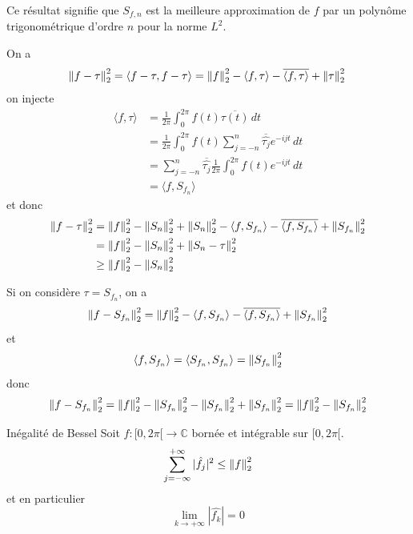 \documentclass[a4paper, 12pt]{article}
\begin{document}
\begin{remarque}
    Ce résultat signifie que $S_{f,n}$ est la meilleure approximation de $f$ par un polynôme trigonométrique d'ordre $n$ pour la norme $L^2$.
\end{remarque}

\begin{demonstration}
    On a 
    $$
    \left\lVert f - \tau\right\rVert_2^2 = \langle f - \tau, f - \tau \rangle = \left\lVert f\right\rVert_2^2 - \langle f, \tau \rangle - \overline{\langle f, \tau \rangle} + \left\lVert\tau\right\rVert_2^2 \\
    $$
    on injecte
    \begin{align*}
        \langle f, \tau \rangle &= \frac{1}{2\pi} \int_0^{2\pi} f(t) \overline{\tau(t)} \, dt \\
        &= \frac{1}{2\pi} \int_0^{2\pi} f(t) \sum_{j=-n}^n \overline{\hat{\tau_j}} e^{-ijt} \, dt \\
        &= \sum_{j=-n}^n \overline{\hat{\tau_j}} \frac{1}{2\pi} \int_0^{2\pi} f(t) e^{-ijt} \, dt \\
        &= \langle f, S_{f_n} \rangle
    \end{align*}
    et donc
    \begin{align*}  
        \left\lVert f - \tau\right\rVert_2^2 &= \left\lVert f\right\rVert_2^2 - \left\lVert S_n\right\rVert_2^2 + \left\lVert S_n\right\rVert_2^2 - \langle f, S_{f_n} \rangle - \overline{\langle f, S_{f_n} \rangle} + \left\lVert S_{f_n}\right\rVert_2^2 \\
        &= \left\lVert f\right\rVert_2^2 - \left\lVert S_n\right\rVert_2^2 + \left\lVert S_n - \tau\right\rVert_2^2 \\
        &\geq \left\lVert f\right\rVert_2^2 - \left\lVert S_n\right\rVert_2^2
    \end{align*}

    Si on considère $\tau = S_{f_n}$, on a
    $$
    \left\lVert f - S_{f_n}\right\rVert_2^2 = \left\lVert f\right\rVert_2^2 - \langle f, S_{f_n} \rangle - \overline{\langle f, S_{f_n} \rangle} + \left\lVert S_{f_n}\right\rVert_2^2
    $$
    et
    $$
    \langle f, S_{f_n} \rangle = \langle S_{f_n}, S_{f_n} \rangle = \left\lVert S_{f_n}\right\rVert_2^2
    $$
    donc
    $$
    \left\lVert f - S_{f_n}\right\rVert_2^2 = \left\lVert f\right\rVert_2^2 - \left\lVert S_{f_n}\right\rVert_2^2 - \left\lVert S_{f_n}\right\rVert_2^2 + \left\lVert S_{f_n}\right\rVert_2^2 = \left\lVert f\right\rVert_2^2 - \left\lVert S_{f_n}\right\rVert_2^2
    $$
\end{demonstration}

\begin{corollaire}{Inégalité de Bessel}{}
    Soit $f: [0, 2\pi[ \to \mathbb{C}$ bornée et intégrable sur $[0, 2\pi[$.
    $$
    \sum_{j=-\infty}^{+\infty} |\hat{f_j}|^2 \leq \left\lVert f\right\rVert_2^2
    $$
    et en particulier
    $$
    \lim_{k \to +\infty} |\hat{f_k}| = 0
    $$
\end{corollaire}
\end{document}
